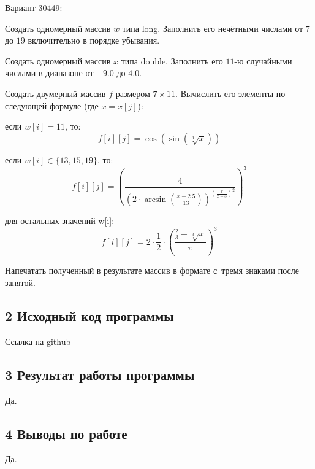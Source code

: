 \newpage
{\ital Вариант 30449:}
\begin{list*}[][\#]
\item Создать одномерный массив $w$ типа long. Заполнить его нечётными числами от $7$ до $19$ включительно в порядке убывания.
\item Создать одномерный массив $x$ типа double. Заполнить его $11$-ю случайными числами в диапазоне от $-9.0$ до $4.0$.
\item Создать двумерный массив $f$ размером $7\times 11$. Вычислить его элементы по следующей формуле {\ital (где $x=x[j]$)}:
\begin{list*}[2]
\item если $w[i] = 11$, то:
$$f[i][j]=\cos(\sin(\sqrt[3]{x}))$$
\item если $w[i]\in\{13,15,19\}$, то:
$$f[i][j]=\left(\frac{4}{\left(2\cdot\arcsin\left(\frac{x-2.5}{13}\right)\right)^{\left(\frac{x}{x-3}\right)^2}}\right)^3$$
\item для остальных значений w[i]:
$$f[i][j]=2\cdot\frac{1}{2}\cdot\left(\frac{\frac{2}{3}-\sqrt[3]{x}}{\pi}\right)^3$$
\end{list*}
\item Напечатать полученный в результате массив в формате с~тремя знаками после запятой.
\end{list*}

\subsection{2 Исходный код программы}

Ссылка на github

\subsection{3 Результат работы программы}

Да.

\subsection{4 Выводы по работе}

Да.


